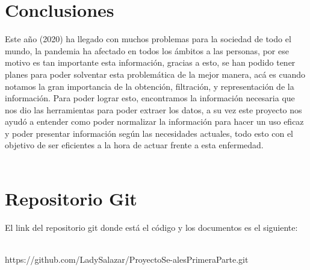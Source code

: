 \documentclass[conference,compsoc,onecolumn]{IEEEtran}
\begin{document}
\section{Conclusiones}
\label{sec:conclusions}
Este año (2020) ha llegado con muchos problemas para la sociedad de todo el mundo, la pandemia ha afectado en todos los ámbitos a las personas, por ese motivo es tan importante esta información, gracias a esto, se han podido tener planes para poder solventar esta problemática de la mejor manera, acá es cuando notamos la gran importancia de la obtención, filtración, y representación de la información. Para poder lograr esto, encontramos la información necesaria que nos dio las herramientas para poder extraer los datos, a su vez este proyecto nos ayudó a entender como poder normalizar la información para hacer un uso eficaz y poder presentar información según las necesidades actuales, todo esto con el objetivo de ser eficientes a la hora de actuar frente a esta enfermedad.
\\\

\section{Repositorio Git}
\label{sec:Repositorio}

El link del repositorio git donde está el código y los documentos es el siguiente:
\\\

https://github.com/LadySalazar/ProyectoSe-alesPrimeraParte.git
\\\

\\\
\nocite{*}

\label{sec:biblio}
 





\end{document}
